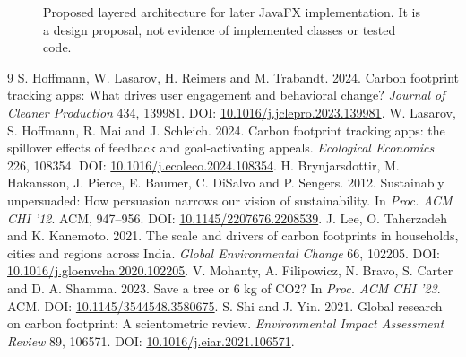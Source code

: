 \documentclass[12pt, a4paper]{article}
\begin{document}
\begin{figure}[H]
\centering
{}
\caption{Proposed layered architecture for later JavaFX implementation. It is a design proposal, not evidence of implemented classes or tested code.}
\label{fig:proposed-architecture}
\end{figure}




\begin{thebibliography}{9}
 S. Hoffmann, W. Lasarov, H. Reimers and M. Trabandt. 2024. Carbon footprint tracking apps: What drives user engagement and behavioral change? \emph{Journal of Cleaner Production} 434, 139981. DOI: \href{https://doi.org/10.1016/j.jclepro.2023.139981}{10.1016/j.jclepro.2023.139981}.
 W. Lasarov, S. Hoffmann, R. Mai and J. Schleich. 2024. Carbon footprint tracking apps: the spillover effects of feedback and goal-activating appeals. \emph{Ecological Economics} 226, 108354. DOI: \href{https://doi.org/10.1016/j.ecoleco.2024.108354}{10.1016/j.ecoleco.2024.108354}.
 H. Brynjarsdottir, M. Hakansson, J. Pierce, E. Baumer, C. DiSalvo and P. Sengers. 2012. Sustainably unpersuaded: How persuasion narrows our vision of sustainability. In \emph{Proc. ACM CHI '12}. ACM, 947--956. DOI: \href{https://doi.org/10.1145/2207676.2208539}{10.1145/2207676.2208539}.
 J. Lee, O. Taherzadeh and K. Kanemoto. 2021. The scale and drivers of carbon footprints in households, cities and regions across India. \emph{Global Environmental Change} 66, 102205. DOI: \href{https://doi.org/10.1016/j.gloenvcha.2020.102205}{10.1016/j.gloenvcha.2020.102205}.
 V. Mohanty, A. Filipowicz, N. Bravo, S. Carter and D. A. Shamma. 2023. Save a tree or 6 kg of CO2? In \emph{Proc. ACM CHI '23}. ACM. DOI: \href{https://doi.org/10.1145/3544548.3580675}{10.1145/3544548.3580675}.
 S. Shi and J. Yin. 2021. Global research on carbon footprint: A scientometric review. \emph{Environmental Impact Assessment Review} 89, 106571. DOI: \href{https://doi.org/10.1016/j.eiar.2021.106571}{10.1016/j.eiar.2021.106571}.
\end{thebibliography}
\end{document}
